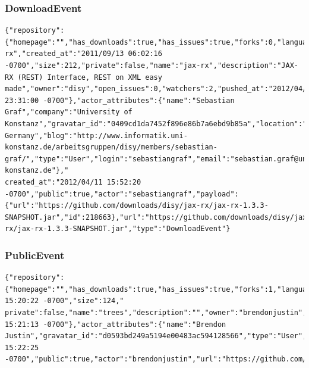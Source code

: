 \documentclass[a4paper,10pt]{article}
\begin{document}
\subsubsection{DownloadEvent}
\begin{lstlisting}
{"repository":{"homepage":"","has_downloads":true,"has_issues":true,"forks":0,"language":"Java","fork":true,"has_wiki":false,"organization":"disy","url":"https://github.com/disy/jax-rx","created_at":"2011/09/13 06:02:16 -0700","size":212,"private":false,"name":"jax-rx","description":"JAX-RX (REST) Interface, REST on XML easy made","owner":"disy","open_issues":0,"watchers":2,"pushed_at":"2012/04/06 23:31:00 -0700"},"actor_attributes":{"name":"Sebastian Graf","company":"University of Konstanz","gravatar_id":"0409cd1da7452f896e86b7a6ebd9b85a","location":"Konstanz, Germany","blog":"http://www.informatik.uni-konstanz.de/arbeitsgruppen/disy/members/sebastian-graf/","type":"User","login":"sebastiangraf","email":"sebastian.graf@uni-konstanz.de"},"
created_at":"2012/04/11 15:52:20 -0700","public":true,"actor":"sebastiangraf","payload":{"url":"https://github.com/downloads/disy/jax-rx/jax-rx-1.3.3-SNAPSHOT.jar","id":218663},"url":"https://github.com/downloads/disy/jax-rx/jax-rx-1.3.3-SNAPSHOT.jar","type":"DownloadEvent"}
\end{lstlisting}

\subsubsection{PublicEvent}
\begin{lstlisting}
{"repository":{"homepage":"","has_downloads":true,"has_issues":true,"forks":1,"language":"C++","fork":false,"has_wiki":true,"url":"https://github.com/brendonjustin/trees","created_at":"2012/04/11 15:20:22 -0700","size":124,"
private":false,"name":"trees","description":"","owner":"brendonjustin","open_issues":0,"watchers":1,"pushed_at":"2012/04/11 15:21:13 -0700"},"actor_attributes":{"name":"Brendon Justin","gravatar_id":"d0593bd249a5194e00483ac594128566","type":"User","login":"brendonjustin"},"created_at":"2012/04/11 15:22:25 -0700","public":true,"actor":"brendonjustin","url":"https://github.com/brendonjustin/trees","type":"PublicEvent"}
\end{lstlisting}
\end{document}
